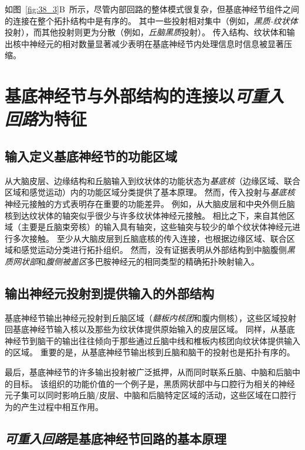 如图~\ref{fig:38_3}B~所示，尽管内部回路的整体模式很复杂，但基底神经节组件之间的连接在整个拓扑结构中是有序的。
其中一些投射相对集中（例如，\textit{黑质-纹状体}投射），而其他投射则更为分散（例如，\textit{丘脑黑质}投射）。
传入结构、纹状体和输出核中神经元的相对数量显著减少表明在基底神经节内处理信息时信息被显著压缩。

\section{基底神经节与外部结构的连接以\textit{可重入回路}为特征}

\subsection{输入定义基底神经节的功能区域}

从大脑皮层、边缘结构和丘脑输入到纹状体的功能状态为\textit{基底核}（边缘区域、联合区域和感觉运动）内的功能区域分类提供了基本原理。
然而，传入投射与\textit{基底核}神经元接触的方式表明存在重要的功能差异。
例如，从大脑皮层和中央外侧丘脑核到达纹状体的轴突似乎很少与许多纹状体神经元接触。
相比之下，来自其他区域（主要是丘脑束旁核）的输入具有轴突，这些轴突与较少的单个纹状体神经元进行多次接触。
至少从大脑皮层到丘脑底核的传入连接，也根据边缘区域、联合区域和感觉运动分类进行拓扑组织。
然而，没有证据表明从外部结构到中脑腹侧\textit{黑质网状部}和\textit{腹侧被盖区}多巴胺神经元的相同类型的精确拓扑映射输入。



\subsection{输出神经元投射到提供输入的外部结构}

基底神经节输出神经元投射到丘脑区域（\textit{髓板内核团}和腹内侧核），这些区域投射回基底神经节输入核以及那些为纹状体提供原始输入的皮层区域。
同样，从基底神经节到脑干的输出往往倾向于那些通过丘脑中线和椎板内核团向纹状体提供输入的区域。
重要的是，从基底神经节输出核到丘脑和脑干的投射也是拓扑有序的。


最后，基底神经节的许多输出投射被广泛抵押，从而同时联系丘脑、中脑和后脑中的目标。
该组织的功能价值的一个例子是，黑质网状部中与口腔行为相关的神经元子集可以同时影响丘脑/皮层、中脑和后脑特定区域的活动，这些区域在口腔行为的产生过程中相互作用。



\subsection{\textit{可重入回路}是基底神经节回路的基本原理}

